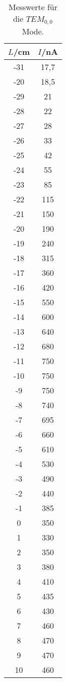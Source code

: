 \begin{table}[htp]
	\begin{center}
    \caption{Messwerte für die $TEM_{0,0}$ Mode.}
    \label{tab:tem00a}
		\begin{tabular}{cc}
		\toprule
			{$L$/cm} & {$I$/nA}\\
			\midrule
			-31 & 17,7\\
			-20 & 18,5\\
			-29 & 21\\
			-28 & 22\\
			-27 & 28\\
			-26 & 33\\
			-25 & 42\\
			-24 & 55\\
			-23 & 85\\
			-22 & 115\\
			-21 & 150\\
			-20 & 190\\
			-19 & 240\\
			-18 & 315\\
			-17 & 360\\
			-16 & 420\\
			-15 & 550\\
			-14 & 600\\
			-13 & 640\\
			-12 & 680\\
			-11 & 750\\
			-10 & 750\\
			-9 & 750\\
			-8 & 740\\
			-7 & 695\\
			-6 & 660\\
			-5 & 610\\
			-4 & 530\\
			-3 & 490\\
			-2 & 440\\
			-1 & 385\\
			0 & 350\\
			1 & 330\\
			2 & 350\\
			3 & 380\\
			4 & 410\\
			5 & 435\\
			6 & 430\\
			7 & 460\\
			8 & 470\\
			9 & 470\\
			10 & 460\\
		\bottomrule
		\end{tabular}
	\end{center}
\end{table}

